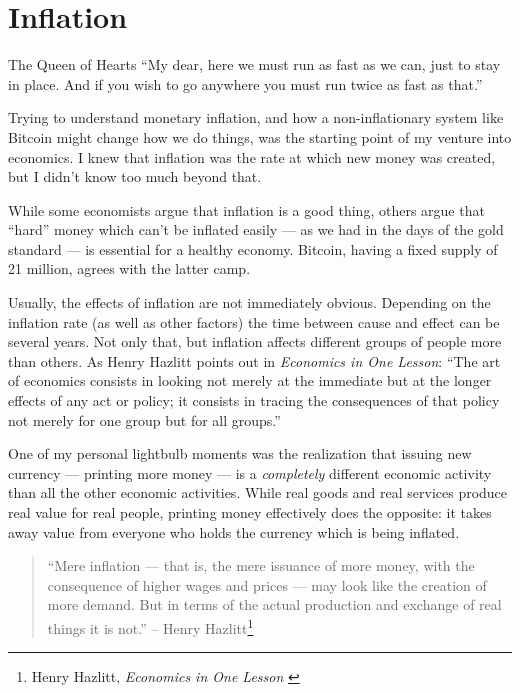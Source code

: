 \chapter{Inflation}
\label{les:9}

\begin{chapquote}{The Queen of Hearts} %
\enquote{My dear, here we must run as fast as we can, just to stay in place. And if you
wish to go anywhere you must run twice as fast as that.}
\end{chapquote}

Trying to understand monetary inflation, and how a non-inflationary
system like Bitcoin might change how we do things, was the starting
point of my venture into economics. I knew that inflation was the rate
at which new money was created, but I didn't know too much beyond that.

While some economists argue that inflation is a good thing, others argue
that \enquote{hard} money which can't be inflated easily --- as we had in the
days of the gold standard --- is essential for a healthy economy.
Bitcoin, having a fixed supply of 21 million, agrees with the latter
camp.

Usually, the effects of inflation are not immediately obvious. Depending
on the inflation rate (as well as other factors) the time between cause
and effect can be several years. Not only that, but inflation affects
different groups of people more than others. As Henry Hazlitt points out
in \textit{Economics in One Lesson}: \enquote{The art of economics consists in looking
not merely at the immediate but at the longer effects of any act or
policy; it consists in tracing the consequences of that policy not
merely for one group but for all groups.}

One of my personal lightbulb moments was the realization that issuing
new currency --- printing more money --- is a \textit{completely} different
economic activity than all the other economic activities. While real
goods and real services produce real value for real people, printing
money effectively does the opposite: it takes away value from everyone
who holds the currency which is being inflated.

\begin{quotation}\begin{samepage}
\enquote{Mere inflation --- that is, the mere issuance of more money, with the
consequence of higher wages and prices --- may look like the creation
of more demand. But in terms of the actual production and exchange of
real things it is not.}
\flushright -- Henry Hazlitt\footnote{Henry Hazlitt, \textit{Economics in One Lesson} \cite{hazlitt}}
\end{samepage}\end{quotation}

